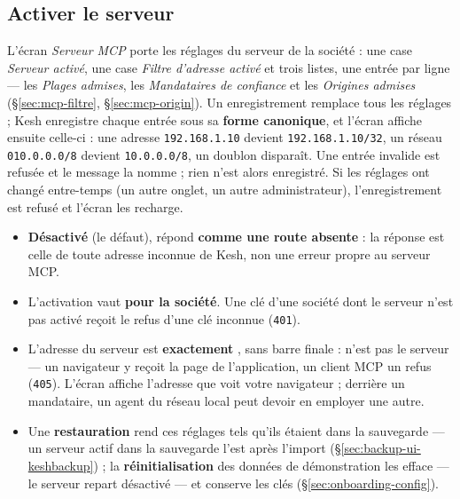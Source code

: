 \documentclass[a4paper,11pt,oneside]{article}
\begin{document}
\subsection{Activer le serveur}\label{sec:mcp-activer}

L'écran \emph{Serveur MCP} porte les réglages du serveur de la société : une case \emph{Serveur activé}, une case \emph{Filtre d'adresse activé} et trois listes, une entrée par ligne --- les \emph{Plages admises}, les \emph{Mandataires de confiance} et les \emph{Origines admises} (\S\ref{sec:mcp-filtre}, \S\ref{sec:mcp-origin}). Un enregistrement remplace tous les réglages ; Kesh enregistre chaque entrée sous sa \textbf{forme canonique}, et l'écran affiche ensuite celle-ci : une adresse \texttt{192.168.1.10} devient \texttt{192.168.1.10/32}, un réseau \texttt{010.0.0.0/8} devient \texttt{10.0.0.0/8}, un doublon disparaît. Une entrée invalide est refusée et le message la nomme ; rien n'est alors enregistré. Si les réglages ont changé entre-temps (un autre onglet, un autre administrateur), l'enregistrement est refusé et l'écran les recharge.

\begin{itemize}
    \item \textbf{Désactivé} (le défaut),  répond \textbf{comme une route absente} : la réponse est celle de toute adresse inconnue de Kesh, non une erreur propre au serveur MCP.
    \item L'activation vaut \textbf{pour la société}. Une clé d'une société dont le serveur n'est pas activé reçoit le refus d'une clé inconnue (\texttt{401}).
    \item L'adresse du serveur est \textbf{exactement} , sans barre finale :  n'est pas le serveur --- un navigateur y reçoit la page de l'application, un client MCP un refus (\texttt{405}). L'écran affiche l'adresse que voit votre navigateur ; derrière un mandataire, un agent du réseau local peut devoir en employer une autre.
    \item Une \textbf{restauration} rend ces réglages tels qu'ils étaient dans la sauvegarde --- un serveur actif dans la sauvegarde l'est après l'import (\S\ref{sec:backup-ui-keshbackup}) ; la \textbf{réinitialisation} des données de démonstration les efface --- le serveur repart désactivé --- et conserve les clés (\S\ref{sec:onboarding-config}).
\end{itemize}
\end{document}
